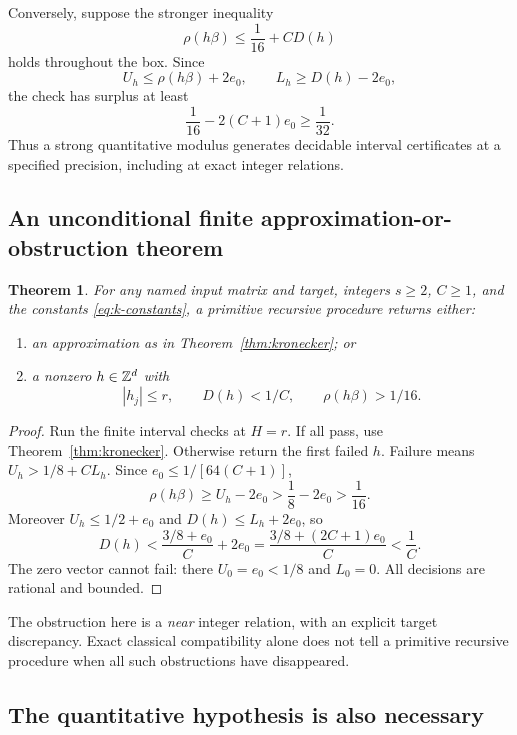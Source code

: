 \documentclass[11pt]{article}
\newtheorem{theorem}{Theorem}[section]
\theoremstyle{definition}\newtheorem{definition}[theorem]{Definition}
\theoremstyle{remark}\newtheorem{remark}[theorem]{Remark}
\begin{document}
Conversely, suppose the stronger inequality
\begin{equation}\label{eq:strong-compat}
 \rho(h\beta)\le\frac1{16}+C D(h)
\end{equation}
holds throughout the box. Since
\[
 U_h\le\rho(h\beta)+2e_0,\qquad L_h\ge D(h)-2e_0,
\]
the check has surplus at least
\[
 \frac1{16}-2(C+1)e_0\ge\frac1{32}.
\]
Thus a strong quantitative modulus generates decidable interval certificates at a specified precision, including at exact integer relations.

\subsection{An unconditional finite approximation-or-obstruction theorem}

\begin{theorem}\label{thm:alternative}
For any named input matrix and target, integers $s\ge2$, $C\ge1$, and the constants \eqref{eq:k-constants}, a primitive recursive procedure returns either:
\begin{enumerate}
\item an approximation as in Theorem~\ref{thm:kronecker}; or
\item a nonzero $h\in\mathbb Z^d$ with
\[
 |h_j|\le r,\qquad D(h)<1/C,\qquad \rho(h\beta)>1/16.
\]
\end{enumerate}
\end{theorem}
\begin{proof}
Run the finite interval checks at $H=r$. If all pass, use Theorem~\ref{thm:kronecker}. Otherwise return the first failed $h$. Failure means $U_h>1/8+C L_h$. Since $e_0\le1/[64(C+1)]$,
\[
 \rho(h\beta)\ge U_h-2e_0>\frac18-2e_0>\frac1{16}.
\]
Moreover $U_h\le1/2+e_0$ and $D(h)\le L_h+2e_0$, so
\[
 D(h)<\frac{3/8+e_0}{C}+2e_0
 =\frac{3/8+(2C+1)e_0}{C}<\frac1C.
\]
The zero vector cannot fail: there $U_0=e_0<1/8$ and $L_0=0$. All decisions are rational and bounded.
\end{proof}

The obstruction here is a \emph{near} integer relation, with an explicit target discrepancy. Exact classical compatibility alone does not tell a primitive recursive procedure when all such obstructions have disappeared.

\subsection{The quantitative hypothesis is also necessary}
\end{document}
